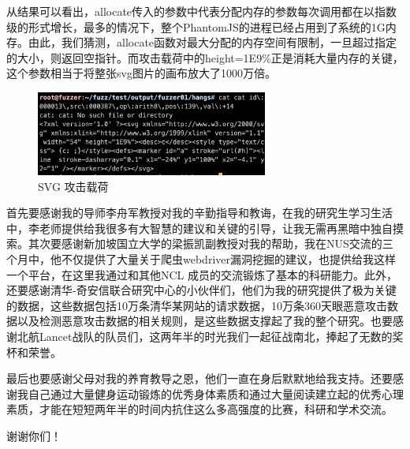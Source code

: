 \documentclass[doctor,privacy,twoside]{buaa_mac}
\begin{document}
  
从结果可以看出，allocate传入的参数中代表分配内存的参数每次调用都在以指数级的形式增长，最多的情况下，整个PhantomJS的进程已经占用到了系统的1G内存。由此，我们猜测，allocate函数对最大分配的内存空间有限制，一旦超过指定的大小，则返回空指针。而攻击载荷中的height=1E9\%正是消耗大量内存的关键，这个参数相当于将整张svg图片的画布放大了1000万倍。

\centerline{}
\begin{figure}[!h]
  \centering
  \includegraphics[width=0.68\textwidth]{images/svg_payload.png}
  \caption{SVG 攻击载荷}
  \label{fig:logo}
\end{figure}





\achievement


\acknowledgments

首先要感谢我的导师李舟军教授对我的辛勤指导和教诲，在我的研究生学习生活中，李老师提供给我很多有大智慧的建议和关键的引导，让我无需再黑暗中独自摸索。其次要感谢新加坡国立大学的梁振凯副教授对我的帮助，我在NUS交流的三个月中，他不仅提供了大量关于爬虫webdriver漏洞挖掘的建议，也提供给我这样一个平台，在这里我通过和其他NCL 成员的交流锻炼了基本的科研能力。此外，还要感谢清华-奇安信联合研究中心的小伙伴们，他们为我的研究提供了极为关键的数据，这些数据包括10万条清华某网站的请求数据，10万条360天眼恶意攻击数据以及检测恶意攻击数据的相关规则，是这些数据支撑起了我的整个研究。也要感谢北航Lancet战队的队员们，这两年半的时光我们一起征战南北，捧起了无数的奖杯和荣誉。

最后也要感谢父母对我的养育教导之恩，他们一直在身后默默地给我支持。还要感谢我自己通过大量健身运动锻炼的优秀身体素质和通过大量阅读建立起的优秀心理素质，才能在短短两年半的时间内抗住这么多高强度的比赛，科研和学术交流。

谢谢你们！


%

%

\vspace{5cm}
\end{document}

